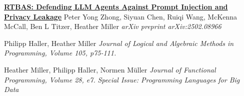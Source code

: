 \documentclass[9pt]{article}
\begin{document}
\bigskip

\noindent\href{https://arxiv.org/abs/2502.08966}{\bf RTBAS: Defending LLM Agents Against Prompt Injection and}\vspace{-0.03in}
\newline\noindent\href{https://arxiv.org/abs/2502.08966}{\bf Privacy Leakage}
\newline\noindent Peter Yong Zhong, Siyuan Chen, Ruiqi Wang, McKenna McCall, \vspace{-0.03in}
\newline\noindent Ben L Titzer, Heather Miller
\newline\noindent\emph{arXiv preprint arXiv:2502.08966}
\bigskip


\bigskip


\newline\noindent Philipp Haller, Heather Miller
\newline\noindent\emph{Journal of Logical and Algebraic Methods in Programming, Volume 105, p75-111.}
\bigskip

\newline{}
\newline\noindent Heather Miller, Philipp Haller, Normen M\"{u}ller
\newline\noindent\emph{Journal of Functional Programming, Volume 28, e7.}
\newline\noindent\emph{Special Issue: Programming Languages for Big Data}
\bigskip
\end{document}
